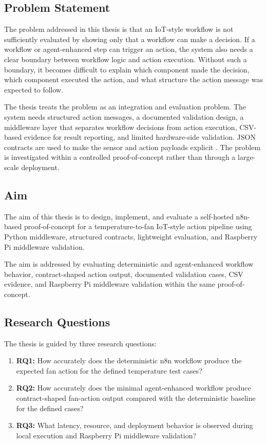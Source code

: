 \subsection{Problem Statement}\label{subsec:problem-statement}

The problem addressed in this thesis is that an IoT-style workflow is not sufficiently evaluated by showing only that a workflow can make a decision. If a workflow or agent-enhanced step can trigger an action, the system also needs a clear boundary between workflow logic and action execution. Without such a boundary, it becomes difficult to explain which component made the decision, which component executed the action, and what structure the action message was expected to follow.

The thesis treats the problem as an integration and evaluation problem. The system needs structured action messages, a documented validation design, a middleware layer that separates workflow decisions from action execution, CSV-based evidence for result reporting, and limited hardware-side validation. JSON contracts are used to make the sensor and action payloads explicit \cite{jsonSchemaDocs}. The problem is investigated within a controlled proof-of-concept rather than through a large-scale deployment.

\subsection{Aim}\label{subsec:aim}

The aim of this thesis is to design, implement, and evaluate a self-hosted n8n-based proof-of-concept for a temperature-to-fan IoT-style action pipeline using Python middleware, structured contracts, lightweight evaluation, and Raspberry Pi middleware validation.

The aim is addressed by evaluating deterministic and agent-enhanced workflow behavior, contract-shaped action output, documented validation cases, CSV evidence, and Raspberry Pi middleware validation within the same proof-of-concept.

\subsection{Research Questions}\label{subsec:research-questions}

The thesis is guided by three research questions:

\begin{enumerate}
  \item \textbf{RQ1:} How accurately does the deterministic n8n workflow produce the expected fan action for the defined temperature test cases?
  \item \textbf{RQ2:} How accurately does the minimal agent-enhanced workflow produce contract-shaped fan-action output compared with the deterministic baseline for the defined cases?
  \item \textbf{RQ3:} What latency, resource, and deployment behavior is observed during local execution and Raspberry Pi middleware validation?
\end{enumerate}

